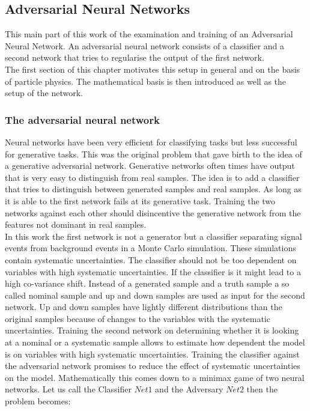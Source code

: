 \subsection{Adversarial Neural Networks}

This main part of this work of the examination and training of an Adversarial Neural Network. An adversarial neural network consists of a classifier and a second network that tries to regularise the output of the first network.\\
The first section of this chapter motivates this setup in general and on the basis of particle physics. The mathematical basis is then introduced as well as the setup of the network.

\subsubsection{The adversarial neural network}

Neural networks have been very efficient for classifying tasks but less successful for generative tasks. This was the original problem that gave birth to the idea of a generative adversarial network. Generative networks often times have output that is very easy to distinguish from real samples. The idea is to add a classifier that tries to distinguish between generated samples and real samples. As long as it is able to the first network fails at its generative task. Training the two networks against each other should disincentive the generative network from the features not dominant in real samples.\\
In this work the first network is not a generator but a classifier separating signal events from background events in a Monte Carlo simulation. These simulations contain systematic uncertainties. The classifier should not be too dependent on variables with high systematic uncertainties. If the classifier is it might lead to a high co-variance shift. Instead of a generated sample and a truth sample a so called nominal sample and up and down samples are used as input for the second network. Up and down samples have lightly different distributions than the original samples because of changes to the variables with the systematic uncertainties. Training the second network on determining whether it is looking at a nominal or a systematic sample allows to estimate how dependent the model is on variables with high systematic uncertainties. Training the classifier against the adversarial network promises to reduce the effect of systematic uncertainties on the model.
Mathematically this comes down to a minimax game of two neural networks. Let us call the Classifier $Net1$ and the Adversary $Net2$ then the problem becomes:

